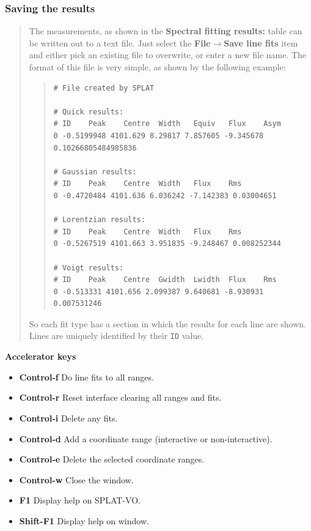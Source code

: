 \documentclass[twoside,11pt]{article}
\newcommand{\latexhtml}[2]{#1}
\renewcommand{\_}{\texttt{\symbol{95}}}
\newcommand{\SPLAT}{\textsf{SPLAT-VO}}
\newcommand{\submenuitem}[2]{\latexhtml{\textbf{#1$\rightarrow$#2}}{\textbf{#1->#2}}}
\newcommand{\labelitem}[1]{\textbf{#1}}
\newcommand{\hitext}[1]{\texttt{#1}}
\newcommand{\subheading}[1]{\textbf{\large{#1}}}
\begin{document}
\subsubsection{Saving the results}
\begin{quote}
 The measurements, as shown in the \labelitem{Spectral fitting
 results:} table can be written out to a text file. Just select the
 \submenuitem{File}{Save line fits} item and either pick an existing file
 to overwrite, or enter a new file name. The format of this file is
 very simple, as shown by the following example:
 \begin{quote}
  \begin{verbatim}
# File created by SPLAT

# Quick results:
# ID    Peak    Centre  Width   Equiv   Flux    Asym
0 -0.5199948 4101.629 8.29817 7.857605 -9.345678 0.10266805484985836

# Gaussian results:
# ID    Peak    Centre  Width   Flux    Rms
0 -0.4720484 4101.636 6.036242 -7.142383 0.03004651

# Lorentzian results:
# ID    Peak    Centre  Width   Flux    Rms
0 -0.5267519 4101.663 3.951835 -9.248467 0.008252344

# Voigt results:
# ID    Peak    Centre  Gwidth  Lwidth  Flux    Rms
0 -0.513331 4101.656 2.099387 9.640681 -8.930931 0.007531246
  \end{verbatim}
 \end{quote}
 So each fit type has a section in which the results for each line are
 shown. Lines are uniquely identified by their \hitext{ID} value.
\end{quote}

\subheading{Accelerator keys}

\begin{itemize}
\item \labelitem{Control-f} Do line fits to all ranges.
\item \labelitem{Control-r} Reset interface clearing all ranges and fits.
\item \labelitem{Control-i} Delete any fits.

\item \labelitem{Control-d} Add a coordinate range (interactive or non-interactive).
\item \labelitem{Control-e} Delete the selected coordinate ranges.
 
\item \labelitem{Control-w} Close the window.
\item \labelitem{F1} Display help on \SPLAT.     
\item \labelitem{Shift-F1} Display help on window.
\end{itemize}
\end{document}
